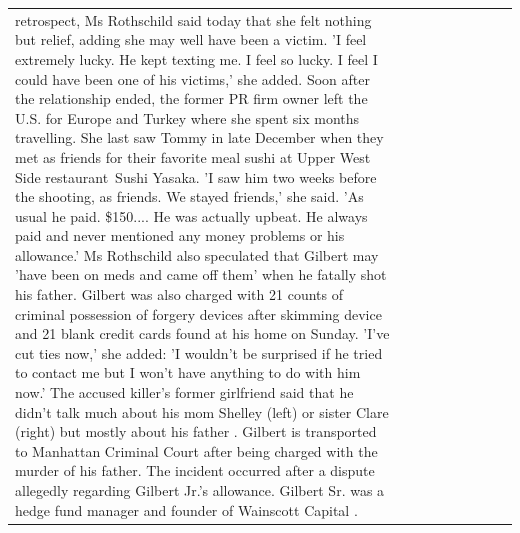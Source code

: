 \begin{table}[H]
\begin{tabular}{lllrlllll}
retrospect, Ms Rothschild said today that she felt nothing but relief, adding she may well have been a victim. 'I feel extremely lucky. He kept texting me. I feel so lucky. I feel I could have been one of his victims,' she added. Soon after the relationship ended, the former PR firm owner left the U.S. for Europe and Turkey where she spent six months  travelling. She last saw Tommy in late December when they met as friends for their favorite meal sushi at Upper West Side restaurant Sushi Yasaka. 'I saw him two weeks before the shooting, as friends. We stayed friends,' she said. 'As usual he paid. \$150.... He was actually upbeat. He always paid and never mentioned any money problems or his allowance.' Ms Rothschild also speculated that Gilbert may 'have been on meds and came off them' when he fatally shot his father. Gilbert was also charged with 21 counts of criminal possession of forgery devices after skimming device and 21 blank credit cards found at his home on Sunday. 'I've cut ties now,' she added: 'I wouldn’t be surprised if he tried to contact me but I won’t have anything to do with him now.' The accused killer's former girlfriend said that he didn't talk much about his mom Shelley (left) or sister Clare (right) but mostly about his father . Gilbert is transported to Manhattan Criminal Court  after being charged with the murder of his father. The incident occurred after a dispute allegedly regarding Gilbert Jr.'s allowance. Gilbert Sr. was a hedge fund manager and founder of Wainscott Capital .


\end{tabular}
\end{table}
